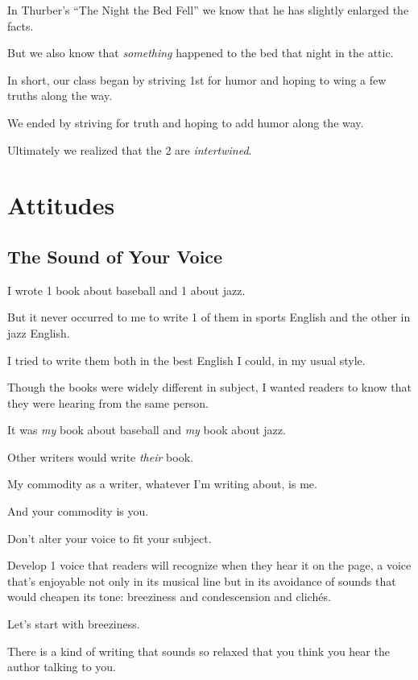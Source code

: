 \documentclass{book}
\numberwithin{equation}{section}
\begin{document}
In Thurber's ``The Night the Bed Fell'' we know that he has slightly enlarged the facts.

But we also know that \textit{something} happened to the bed that night in the attic.

%
In short, our class began by striving 1st for humor and hoping to wing a few truths along the way.

We ended by striving for truth and hoping to add humor along the way.

Ultimately we realized that the 2 are \textit{intertwined}.


\part{Attitudes}

\chapter{The Sound of Your Voice}

I wrote 1 book about baseball and 1 about jazz.

But it never occurred to me to write 1 of them in sports English and the other in jazz English.

I tried to write them both in the best English I could, in my usual style.

Though the books were widely different in subject, I wanted readers to know that they were hearing from the same person.

It was \textit{my} book about baseball and \textit{my} book about jazz.

Other writers would write \textit{their} book.

My commodity as a writer, whatever I'm writing about, is me.

And your commodity is you.

Don't alter your voice to fit your subject.

Develop 1 voice that readers will recognize when they hear it on the page, a voice that's enjoyable not only in its musical line but in its avoidance of sounds that would cheapen its tone: breeziness and condescension and clich\'es.

%
Let's start with breeziness.

%
There is a kind of writing that sounds so relaxed that you think you hear the author talking to you.
\end{document}
